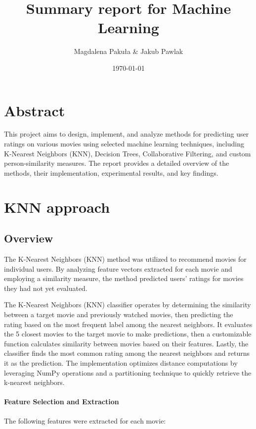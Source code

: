 \documentclass[a3paper,12pt]{article}
\title{Summary report for Machine Learning}
\author{Magdalena Pakuła \& Jakub Pawlak}
\date{\today}
\begin{document}
\maketitle

\section*{Abstract}

This project aims to design, implement, and analyze methods for predicting user ratings on various movies
using selected machine learning techniques, including K-Nearest Neighbors (KNN), Decision Trees,
Collaborative Filtering, and custom person-similarity measures.
The report provides a detailed overview of the methods, their implementation, experimental results, and key findings.

\tableofcontents
\newpage

\section{KNN approach}
\subsection{Overview}

The K-Nearest Neighbors (KNN) method was utilized to recommend movies for individual users.
By analyzing feature vectors extracted for each movie and employing a similarity measure,
the method predicted users’ ratings for movies they had not yet evaluated.

The K-Nearest Neighbors (KNN) classifier operates by determining the
similarity between a target movie and previously watched movies,
then predicting the rating based on the most frequent label among
the nearest neighbors.
It evaluates the 5 closest movies to the target movie to make predictions, then
a customizable function calculates similarity between movies based on their features.
Lastly, the classifier finds the most common rating among the nearest
neighbors and returns it as the prediction.
The implementation optimizes distance computations by leveraging
NumPy operations and a partitioning technique to quickly retrieve the k-nearest
neighbors.

\paragraph{Feature Selection and Extraction}
The following features were extracted for each movie:
\end{document}
